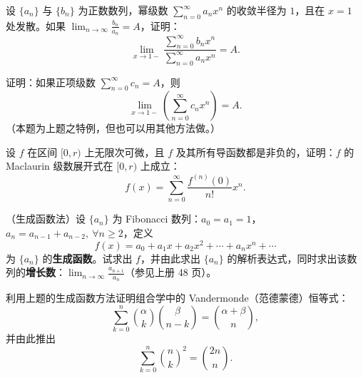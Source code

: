 \begin{xreferenceproblem}[11]
设 $\{a_n\}$ 与 $\{b_n\}$ 为正数数列，幂级数 $\displaystyle\sum_{n=0}^{\infty}a_nx^n$ 的收敛半径为 $1$，且在 $x=1$ 处发散。如果 $\displaystyle\lim_{n\to\infty}\frac{b_n}{a_n}=A$，证明：
  \[
    \lim_{x\to1-}\frac{\displaystyle\sum_{n=0}^{\infty}b_nx^n}{\displaystyle\sum_{n=0}^{\infty}a_nx^n}=A.
  \]
\end{xreferenceproblem}

\begin{xreferenceproblem}[12]
证明：如果正项级数 $\displaystyle\sum_{n=0}^{\infty}c_n=A$，则
  \[
    \lim_{x\to1-}\left(\sum_{n=0}^{\infty}c_nx^n\right)=A.
  \]
  （本题为上题之特例，但也可以用其他方法做。）
\end{xreferenceproblem}

\begin{xreferenceproblem}[13]
设 $f$ 在区间 $[0,r)$ 上无限次可微，且 $f$ 及其所有导函数都是非负的，证明：$f$ 的 Maclaurin 级数展开式在 $[0,r)$ 上成立：
  \[
    f(x)=\sum_{n=0}^{\infty}\frac{f^{(n)}(0)}{n!}x^n.
  \]
\end{xreferenceproblem}

\begin{xreferenceproblem}[14]
（生成函数法）设 $\{a_n\}$ 为 Fibonacci 数列：$a_0=a_1=1$，$a_n=a_{n-1}+a_{n-2},\ \forall n\geqslant2$，定义
  \[
    f(x)=a_0+a_1x+a_2x^2+\cdots+a_nx^n+\cdots
  \]
  为 $\{a_n\}$ 的\textbf{生成函数}。试求出 $f$，并由此求出 $\{a_n\}$ 的解析表达式，同时求出该数列的\textbf{增长数}：$\displaystyle\lim_{n\to\infty}\frac{a_{n+1}}{a_n}$（参见上册 48 页）。
\end{xreferenceproblem}

\begin{xreferenceproblem}[15]
利用上题的生成函数方法证明组合学中的 Vandermonde（范德蒙德）恒等式：
  \[
    \sum_{k=0}^{n}{\alpha\choose k}{\beta\choose n-k}={\alpha+\beta\choose n},
  \]
  并由此推出
  \[
    \sum_{k=0}^{n}{n\choose k}^2={2n\choose n}.
  \]
\end{xreferenceproblem}
